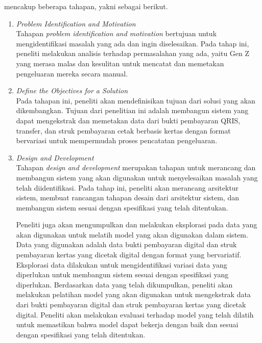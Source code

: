 \dsrm{} mencakup beberapa tahapan, yakni sebagai berikut.
\begin{enumerate}
	\item \emph{Problem Identification and Motivation}~\\
	      Tahapan \emph{problem identification and motivation} bertujuan untuk mengidentifikasi masalah yang ada dan ingin diselesaikan. Pada tahap ini, peneliti melakukan analisis terhadap permasalahan yang ada, yaitu Gen Z yang merasa malas dan kesulitan untuk mencatat dan memetakan pengeluaran mereka secara manual.
	\item \emph{Define the Objectives for a Solution}~\\
	      Pada tahapan ini, peneliti akan mendefinisikan tujuan dari solusi yang akan dikembangkan. Tujuan dari penelitian ini adalah membangun sistem yang dapat mengekstrak dan memetakan data dari bukti pembayaran QRIS, transfer, dan struk pembayaran cetak berbasis kertas dengan format bervariasi untuk mempermudah proses pencatatan pengeluaran.
	\item \emph{Design and Development}~\\
	      Tahapan \emph{design and development} merupakan tahapan untuk merancang dan membangun sistem yang akan digunakan untuk menyelesaikan masalah yang telah diidentifikasi. Pada tahap ini, peneliti akan merancang arsitektur sistem, membuat rancangan tahapan desain dari arsitektur sistem, dan membangun sistem sesuai dengan spesifikasi yang telah ditentukan.
		  
		  Peneliti juga akan mengumpulkan dan melakukan eksplorasi pada data yang akan digunakan untuk melatih model \dl{} yang akan digunakan dalam sistem. Data yang digunakan adalah data bukti pembayaran digital dan struk pembayaran kertas yang dicetak digital dengan format yang bervariatif. Eksplorasi data dilakukan untuk mengidentifikasi variasi data yang diperlukan untuk membangun sistem sesuai dengan spesifikasi yang diperlukan. Berdasarkan data yang telah dikumpulkan, peneliti akan melakukan pelatihan model \dl{} yang akan digunakan untuk mengekstrak data dari bukti pembayaran digital dan struk pembayaran kertas yang dicetak digital. Peneliti akan melakukan evaluasi terhadap model yang telah dilatih untuk memastikan bahwa model dapat bekerja dengan baik dan sesuai dengan spesifikasi yang telah ditentukan.


\end{enumerate}
